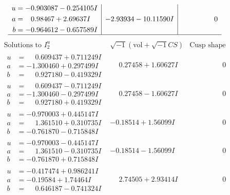 \documentclass[1p]{elsarticle_modified}
\theoremstyle{definition}
\newcommand{\I}{\sqrt{-1}}
\begin{document}
$$\begin{array}{c|c|c}
\begin{aligned}
u &= -0.903087 - 0.254105 I \\
a &= \phantom{-}0.98467 + 2.69637 I \\
b &= -0.964612 - 0.657589 I\end{aligned}
 & -2.93934 - 10.11590 I & \phantom{-0.000000 } 0\\
 \hline 
 \end{array}$$\newpage$$\begin{array}{c|c|c}  
\text{Solutions to }I^u_{2}& \I (\text{vol} + \sqrt{-1}CS) & \text{Cusp shape}\\
 \hline 
\begin{aligned}
u &= \phantom{-}0.609437 + 0.711249 I \\
a &= -1.300460 + 0.297499 I \\
b &= \phantom{-}0.927180 - 0.419329 I\end{aligned}
 & \phantom{-}0.27458 + 1.60627 I & \phantom{-0.000000 } 0 \\ \hline\begin{aligned}
u &= \phantom{-}0.609437 - 0.711249 I \\
a &= -1.300460 - 0.297499 I \\
b &= \phantom{-}0.927180 + 0.419329 I\end{aligned}
 & \phantom{-}0.27458 - 1.60627 I & \phantom{-0.000000 } 0 \\ \hline\begin{aligned}
u &= -0.970003 + 0.445147 I \\
a &= \phantom{-}1.361510 + 0.310735 I \\
b &= -0.761870 - 0.715848 I\end{aligned}
 & -0.18514 + 1.56099 I & \phantom{-0.000000 } 0 \\ \hline\begin{aligned}
u &= -0.970003 - 0.445147 I \\
a &= \phantom{-}1.361510 - 0.310735 I \\
b &= -0.761870 + 0.715848 I\end{aligned}
 & -0.18514 - 1.56099 I & \phantom{-0.000000 } 0 \\ \hline\begin{aligned}
u &= -0.417474 + 0.986241 I \\
a &= -0.19584 + 1.74464 I \\
b &= \phantom{-}0.646187 - 0.741324 I\end{aligned}
 & \phantom{-}2.74505 + 2.93414 I & \phantom{-0.000000 } 0 \\ \hline\begin{aligned}

\end{aligned}
\end{array}$$
\end{document}
